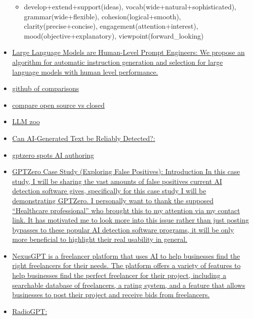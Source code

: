 \begin{itemize}
  \begin{itemize}
   
  \item
    develop+extend+support(ideas), vocab(wide+natural+sophisticated),
    grammar(wide+flexible), cohesion(logical+smooth),
    clarity(precise+concise), engagement(attention+interest),
    mood(objective+explanatory), viewpoint(forward\_looking)
  \end{itemize}
\item
  \href{https://openreview.net/forum?id=92gvk82DE-}{Large Language
  Models are Human-Level Prompt Engineers: We propose an algorithm for
  automatic instruction generation and selection for large language
  models with human level performance.}
\item
  \href{https://georgesung.github.io/ai/llm-qa-eval-wikipedia/}{github
  of comparisons}
\item
  \href{https://georgesung.github.io/ai/llm-qa-eval-wikipedia/}{compare
  open source vs closed}
\item
  \href{https://github.com/FreedomIntelligence/LLMZoo}{LLM zoo}
\item
  \href{https://arxiv.org/abs/2303.11156}{Can AI-Generated Text be
  Reliably Detected?:}
\item
  \href{http://gptzero.me/}{gptzero spots AI authoring}
\item
  \href{https://gonzoknows.com/posts/GPTZero-Case-Study/}{GPTZero Case
  Study (Exploring False Positives): Introduction In this case study, I
  will be sharing the vast amounts of false positives current AI
  detection software gives, specifically for this case study I will be
  demonstrating GPTZero. I personally want to thank the supposed
  ``Healthcare professional'' who brought this to my attention via my
  contact link. It has motivated me to look more into this issue rather
  than just posting bypasses to these popular AI detection software
  programs, it will be only more beneficial to highlight their real
  usability in general.}
\item
  \href{https://nexus.snikpic.io}{NexusGPT is a freelancer platform that
  uses AI to help businesses find the right freelancers for their needs.
  The platform offers a variety of features to help businesses find the
  perfect freelancer for their project, including a searchable database
  of freelancers, a rating system, and a feature that allows businesses
  to post their project and receive bids from freelancers.}
\item
  \href{https://interestingengineering.com/innovation/radiogpt-worlds-first-ai-radio-station}{RadioGPT:
}
\end{itemize}
